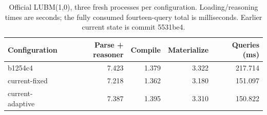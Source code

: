 \begin{table}[ht]
\caption{Official LUBM(1,0), three fresh processes per configuration. Loading/reasoning times are seconds; the fully consumed fourteen-query total is milliseconds. Earlier current state is commit 5531be4.}
\label{tab:lubm}
\centering\small
\begin{tabular}{@{}lrrrr@{}}
\toprule
Configuration & Parse + reasoner & Compile & Materialize & Queries (ms) \\
\midrule
b1254c4 & 7.423 & 1.379 & 3.322 & 217.714 \\
current-fixed & 7.218 & 1.362 & 3.180 & 151.097 \\
current-adaptive & 7.387 & 1.395 & 3.310 & 150.822 \\
\bottomrule
\end{tabular}
\end{table}

